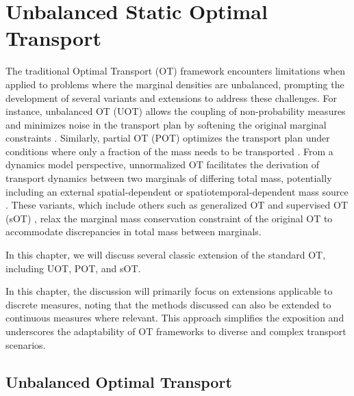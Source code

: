 \documentclass[11pt]{book}
\begin{document}
\chapter[Unbalanced Static OT]{Unbalanced Static Optimal Transport}\label{chapter:UnbalancedSOT}

The traditional Optimal Transport (OT) framework encounters limitations when applied to problems where the marginal densities are unbalanced, prompting the development of several variants and extensions to address these challenges. For instance, unbalanced OT (UOT) allows the coupling of non-probability measures and minimizes noise in the transport plan by softening the original marginal constraints \cite{chizat2018unbalanced,chizat2018scaling}. Similarly, partial OT (POT) optimizes the transport plan under conditions where only a fraction of the mass needs to be transported \cite{benamou2015augmented,bonneel2019spot,chapel2020partial}. From a dynamics model perspective, unnormalized OT facilitates the derivation of transport dynamics between two marginals of differing total mass, potentially including an external spatial-dependent or spatiotemporal-dependent mass source \cite{gangbo2019unnormalized,lee2021generalized}. These variants, which include others such as generalized OT \cite{piccoli2014generalized} and supervised OT (sOT) \cite{cang2022supervised}, relax the marginal mass conservation constraint of the original OT to accommodate discrepancies in total mass between marginals. 

In this chapter, we will discuss several classic extension of the standard OT, including UOT, POT, and sOT.

In this chapter, the discussion will primarily focus on extensions applicable to discrete measures, noting that the methods discussed can also be extended to continuous measures where relevant. This approach simplifies the exposition and underscores the adaptability of OT frameworks to diverse and complex transport scenarios.


\section[Unbalanced OT]{Unbalanced Optimal Transport}
\end{document}
